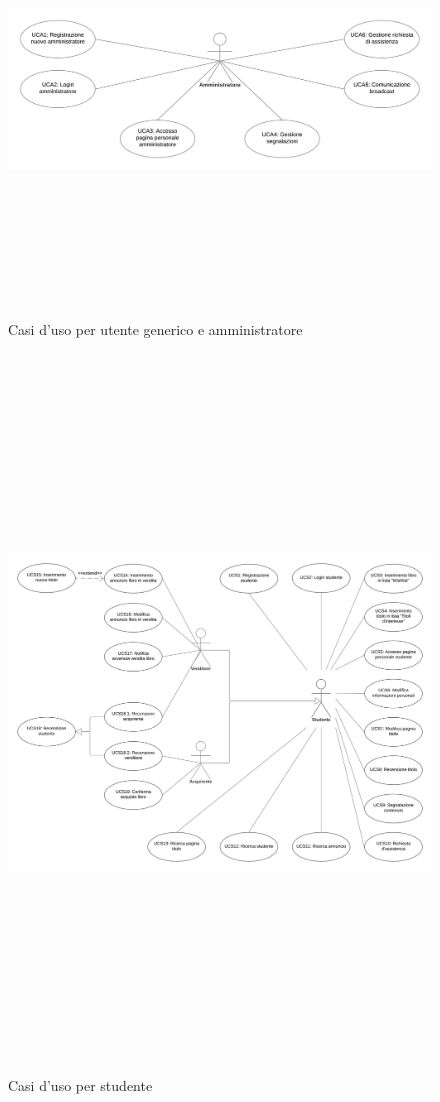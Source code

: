 \documentclass[10pt,a4paper]{report}
\begin{document}
	\begin{figure}[H]
		\centering
		\includegraphics[height=12cm, width=17cm, keepaspectratio]{gua_uc}
		\caption{Casi d'uso per utente generico e amministratore}
	\end{figure}

	\begin{figure}[H]
		\centering
		\includegraphics[height=19cm, width=17cm, keepaspectratio]{st_uc}
		\caption{Casi d'uso per studente}
	\end{figure}
\end{document}
